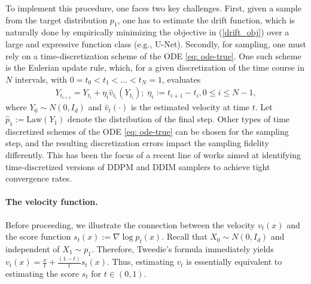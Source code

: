\documentclass{article}
\theoremstyle{plain}
\theoremstyle{definition}
\theoremstyle{remark}
\def\bbE{\mathbb{E}}
\def\cF{\mathcal{F}}
\def\Cov{\text{Cov}}
\newcommand{\br}[1]{\left({#1}\right)}
\newcommand{\Law}{\text{Law}}
\begin{document}
To implement this procedure, one faces two key challenges. 
First, given a sample from the target distribution $p_1$, one has to estimate the drift function, which is naturally done by empirically minimizing the objective in (\ref{drift_obj}) over a large and expressive function class (e.g., U-Net). %
Secondly, for sampling, one must rely on a time-discretization scheme of the ODE \eqref{eq: ode-true}. One such scheme is the Eulerian update rule, which, for a given discretization of the time course in $N$ intervals, with $0 = t_0 < t_1 < \dots < t_N =1$, evaluates 
\begin{align}
\label{eq: emp-ode-disc}
    Y_{t_{i+1}} =  Y_{t_{i}} + \eta_i\widehat v_{t_{i}}(Y_{t_{i}}); \; \eta_i :=  t_{i+1}-t_{i}, 0 \le i \le N-1,
\end{align}
where $Y_0 \sim N(0, I_d)$ and $\widehat v_t(\cdot)$ is the estimated velocity at time $t$. Let $\widehat p_1 := \Law(Y_1)$ denote the distribution of the final step. Other types of time discretized schemes of the ODE \eqref{eq: ode-true} can be chosen for the sampling step, and the resulting discretization errors impact the sampling fidelity differently. This has been the focus of a recent line of works \citep{benton2023nearly, chen2022sampling, li2024towards, li2024sharp, huang2024denoising, liang2025low} aimed at identifying time-discretized versions of DDPM and DDIM samplers to achieve tight convergence rates.

\paragraph{The velocity function.} 
Before proceeding, we illustrate the connection between the velocity $v_t(x)$ and the score function $s_t(x):= \nabla \log p_t(x)$. Recall that $X_0 \sim N(0, I_d)$ and independent of $X_1\sim p_1$. Therefore, Tweedie's formula \citep{efron2011tweedie, meng2021estimating} immediately yields $v_t(x) =  \frac{x}{t} + \frac{(1-t)}{t} s_t(x)$. Thus, estimating $v_t$ is essentially equivalent to estimating the score $s_t$ for $t \in (0,1)$. 
\end{document}
